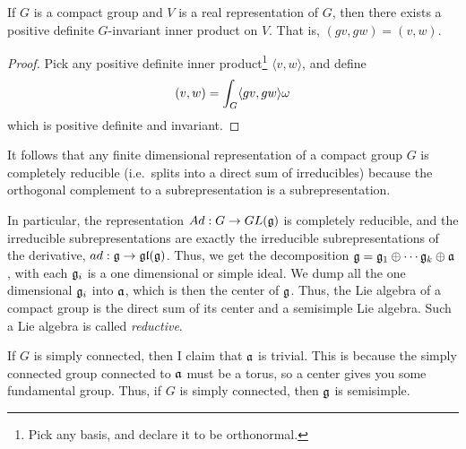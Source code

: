  \begin{theorem}
   If $G$ is a compact group and $V$ is a real representation of $G$, then there
   exists a positive definite $G$-invariant inner product on $V$. That is,
   $(gv,gw)=(v,w)$.
 \end{theorem}
 \begin{proof}
   Pick any positive definite inner product\footnote{Pick any basis, and declare it to
   be orthonormal.} $\langle v,w\rangle$, and define
   \[
    (v,w) = \int_G \langle gv,gw\rangle \omega
   \]
   which is positive definite and invariant.
 \end{proof}
 It follows that any finite dimensional representation of a compact group $G$ is
 completely reducible (i.e.\ splits into a direct sum of irreducibles) because the
 orthogonal complement to a subrepresentation is a subrepresentation.

 In particular, the representation $Ad: G\to GL(\mathfrak{g})$ is completely reducible, and the
 irreducible subrepresentations are exactly the irreducible subrepresentations of the
 derivative, $ad:\mathfrak{g}\to \mathfrak{gl}(\mathfrak{g})$. Thus, we get the decomposition $\mathfrak{g}=\mathfrak{g}_1\oplus\cdots
 \mathfrak{g}_k\oplus \mathfrak{a}$, with each $\mathfrak{g}_i$ is a one dimensional or simple ideal. We dump all
 the one dimensional $\mathfrak{g}_i$ into $\mathfrak{a}$, which is then the center of $\mathfrak{g}$. Thus, the Lie
 algebra of a compact group is the direct sum of its center and a semisimple Lie
 algebra. Such a Lie algebra is called \emph{reductive}.

 If $G$ is simply connected, then I claim that $\mathfrak{a}$ is trivial. This is because the
 simply connected group connected to $\mathfrak{a}$ must be a torus, so a center gives you some
 fundamental group.
 Thus, if $G$ is simply connected, then $\mathfrak{g}$ is semisimple.

